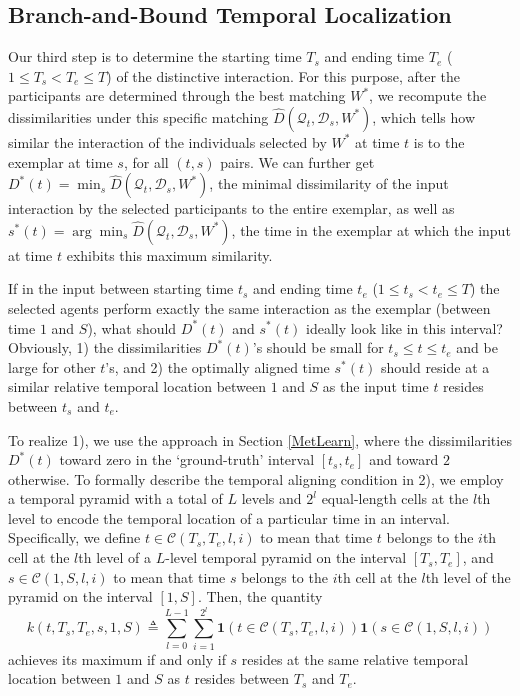 \subsection{Branch-and-Bound Temporal Localization}
\label{BB}

Our third step is to determine the starting time $T_s$ and ending time $T_e$ ($1\le T_s<T_e\le T$) of the distinctive interaction. For this purpose, after the participants are determined through the best matching $W^{*}$, we recompute the dissimilarities under this specific matching $\hat{D}(\mathcal{Q}_{t}, \mathcal{D}_{s}, W^{*})$, which tells how similar the interaction of the individuals selected by $W^{*}$ at time $t$ is to the exemplar at time $s$, for all $(t,s)$ pairs. We can further get  $D^{*}(t)=\min_{s}\hat{D}(\mathcal{Q}_{t}, \mathcal{D}_{s}, W^{*})$, the minimal dissimilarity of the input interaction by the selected participants to the entire exemplar, as well as $s^{*}(t)=\arg\min_{s}\hat{D}(\mathcal{Q}_{t}, \mathcal{D}_{s}, W^{*})$, the time in the exemplar at which the input at time $t$ exhibits this maximum similarity.  

If in the input between starting time $t_{s}$ and ending time $t_{e}$ ($1\leq t_{s}<t_{e}\leq T$) the selected agents perform exactly the same interaction as the exemplar (between time $1$ and $S$), what should $D^{*}(t)$ and $s^{*}(t)$ ideally look like in this interval? Obviously, 1) the dissimilarities $D^{*}(t)$'s should be small for $t_{s}\le t\le t_{e}$ and be large for other $t$'s, and 2) the optimally aligned time $s^{*}(t)$ should reside at a similar relative temporal location between $1$ and $S$ as the input time $t$ resides between $t_{s}$ and $t_{e}$.

To realize 1), we use the approach in Section \ref{MetLearn}, where the dissimilarities $D^{*}(t)$ toward zero in the `ground-truth' interval $[t_{s}, t_{e}]$ and toward $2$ otherwise. To formally describe the temporal aligning condition in 2), we employ a temporal pyramid with a total of $L$ levels and $2^{l}$ equal-length cells at the $l$th level to encode the temporal location of a particular time in an interval. Specifically, we define $t\in\mathcal{C}(T_{s},T_{e}, l,i)$ to mean that time $t$ belongs to the $i$th cell at the $l$th level of a $L$-level temporal pyramid on the interval $[T_{s},T_{e}]$, and $s\in\mathcal{C}(1,S, l,i)$ to mean that time $s$ belongs to the $i$th cell at the $l$th level of the pyramid on the interval $[1,S]$. Then, the quantity
\begin{equation}
k(t, T_{s},T_{e}, s, 1,S)\triangleq\sum^{L-1}_{l=0}\sum^{2^{l}}_{i=1} \mathbf{1}(t\in\mathcal{C}(T_{s},T_{e}, l,i))\mathbf{1}(s\in\mathcal{C}(1,S, l,i))
\end{equation}
achieves its maximum if and only if $s$ resides at the same relative temporal location between $1$ and $S$ as $t$ resides between $T_{s}$ and $T_{e}$.

